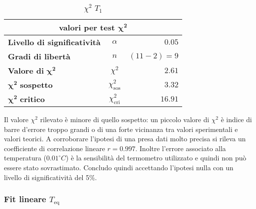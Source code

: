 \documentclass{article}
\begin{document}
	
	\begin{table}[H] \centering
		\begin{small}
			\begin{tabular}{@{}lcr@{}}\toprule
				\multicolumn{3}{c}{\textbf{valori per test} \(\boldsymbol{\chi^2}\)}\\ \midrule
				\textbf{Livello di significatività}		 &  \(\alpha\) &\(0.05\)\footnotemark \\  \hdashline
					\textbf{Gradi di libertà}		 & \(n\)  &\((11-2) = 9\) \\   \hdashline
				\textbf{Valore di} \(\boldsymbol{\chi^2}\)	 & \(\chi^2\)  &\(2.61\)\\  \hdashline
				\(\boldsymbol{\chi^2}\) \textbf{sospetto}		& \(\chi^2_{\text{sos}}\)  &\(3.32\)\\ \hdashline
				\(\boldsymbol{\chi^2}\) \textbf{critico}		& \(\chi^2_{\text{cri}}\)  &\(16.91\)\\ 
				\bottomrule
			\end{tabular}
		\end{small}
		\caption{\(\chi^2\) \(T_{1}\)}
	\end{table}
	
	\noindent
	Il valore \(\chi^2\) rilevato è minore di quello sospetto: un piccolo valore di \(\chi^2\) è indice di barre d'errore troppo grandi o di una forte vicinanza tra valori sperimentali e valori teorici. A corroborare l'ipotesi di una presa dati molto precisa si rileva un coefficiente di correlazione lineare \(r = 0.997\). Inoltre l'errore associato alla temperatura (\(0.01 ^\circ C\)) è la sensibilità del termometro utilizzato e quindi non può essere stato sovrastimato. Concludo quindi accettando l'ipotesi nulla con un livello di significatività del 5\%.
	
	\subsubsection{Fit lineare \(T_{\text{eq}}\)}
	
\end{document}
